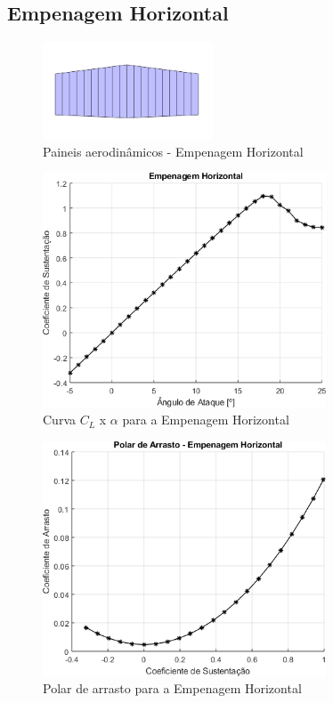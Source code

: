 \subsection{Empenagem Horizontal}
\label{eh}

\begin{figure}[H]
\centering
\includegraphics[width=0.45\textwidth]{images/parte3/malha_eh.PNG}
\caption[Paineis aerodinâmicos - Empenagem Horizontal]{Paineis aerodinâmicos - Empenagem Horizontal}
\label{fig:malha_eh}
\end{figure}

\begin{figure}[H]
\centering
\includegraphics[width=0.75\textwidth]{images/parte3/eh_cl_alfa.png}
\caption[Curva $C_L$ x $\alpha$ para a Empenagem Horizontal]{Curva $C_L$ x $\alpha$ para a Empenagem Horizontal}
\label{fig:eh_cl_alfa}
\end{figure}

\begin{figure}[H]
\centering
\includegraphics[width=0.75\textwidth]{images/parte3/eh_cl_cd.png}
\caption[Polar de arrasto para a Empenagem Horizontal]{Polar de arrasto para a Empenagem Horizontal}
\label{fig:eh_cl_cd}
\end{figure}


